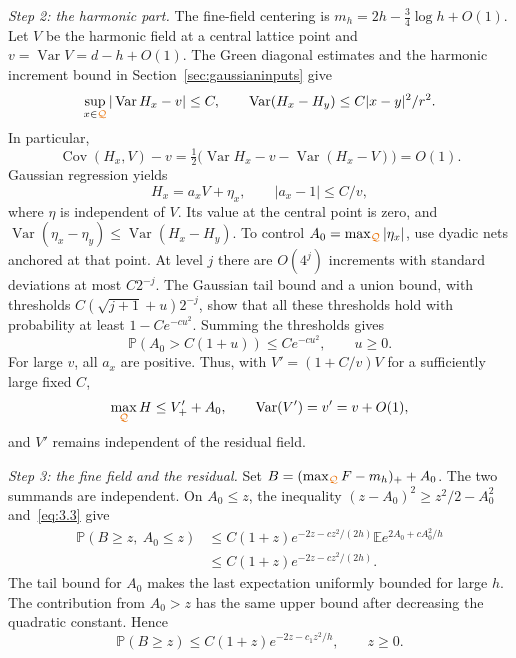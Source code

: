 \documentclass[11pt,letterpaper,reqno]{amsart}
\newif\ifrevmarks \revmarkstrue
\newcommand{\add}[1]{\ifrevmarks\textcolor{revorange}{#1}\else#1\fi}
\newcommand{\ren}[2]{\add{#2}}%
\numberwithin{equation}{section}
\theoremstyle{remark}
\DeclareMathOperator{\Var}{Var}
\DeclareMathOperator{\Cov}{Cov}
\begin{document}
\add{\emph{Step 2: the harmonic part.}} The fine-field centering is $m_h=2h-\tfrac34\log h+O(1)$. Let $V$ be the harmonic field at a central lattice point and $v=\Var V=d-h+O(1)$. The Green diagonal estimates and the harmonic increment bound in Section~\ref{sec:gaussianinputs} give
\[
\sup_{x\in\ren{{C}}{\mathcal Q}}|\Var H_x-v|\le C,
\qquad
\Var(H_x-H_y)\le C|x-y|^2/r^2.
\]
In particular,
\[
\Cov(H_x,V)-v
=\tfrac12\bigl(\Var H_x-v-\Var(H_x-V)\bigr)=O(1).
\]
Gaussian regression yields
\begin{equation}\label{eq:4.6}
H_x=a_xV+\eta_x,\qquad |a_x-1|\le C/v,
\end{equation}
where $\eta$ is independent of $V$. Its value at the central point is zero, and
$\Var(\eta_x-\eta_y)\le\Var(H_x-H_y)$.
To control $A_0=\max_{\ren{C}{\mathcal Q}}|\eta_x|$, use dyadic nets anchored at that point. At level $j$ there are $O(4^j)$ increments with standard deviations at most $C2^{-j}$. The Gaussian tail bound and a union bound, with thresholds
$C(\sqrt{j+1}+u)2^{-j}$, show that all these thresholds hold with probability at least $1-Ce^{-cu^2}$. Summing the thresholds gives
\[
\mathbb P(A_0>C(1+u))\le Ce^{-cu^2},\qquad u\ge0.
\]
For large $v$, all $a_x$ are positive. Thus, with $V'=(1+C/v)V$ for a sufficiently large fixed $C$,
\[
\max_{\ren{C}{\mathcal Q}} H\le V'_++A_0,\qquad \Var(V')=v'=v+O(1),
\]
and $V'$ remains independent of the residual field.

\add{\emph{Step 3: the fine field and the residual.}} Set $B=(\max_{\ren{C}{\mathcal Q}}F-m_h)_++A_0$. The two summands are independent. On $A_0\le z$, the inequality
$(z-A_0)^2\ge z^2/2-A_0^2$ and~\eqref{eq:3.3} give
\[
\begin{split}
\mathbb P(B\ge z,\ A_0\le z)
&\le C(1+z)e^{-2z-cz^2/(2h)}
 \mathbb E e^{2A_0+cA_0^2/h}\\
&\le C(1+z)e^{-2z-cz^2/(2h)}.
\end{split}
\]
The tail bound for $A_0$ makes the last expectation uniformly bounded for large $h$. The contribution from $A_0>z$ has the same upper bound after decreasing the quadratic constant. Hence
\begin{equation}\label{eq:4.7}
\mathbb P(B\ge z)\le C(1+z)e^{-2z-c_1z^2/h},\qquad z\ge0.
\end{equation}
\end{document}
